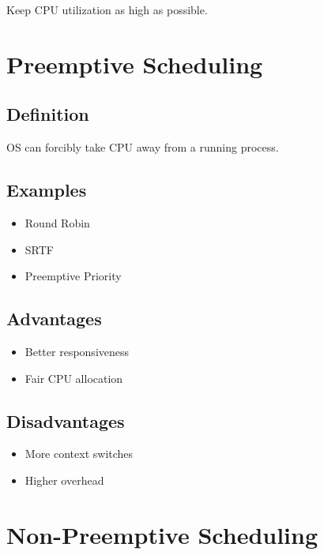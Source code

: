 Keep CPU utilization as high as possible.

\section{Preemptive Scheduling}

\subsection{Definition}

OS can forcibly take CPU away from a running process.

\subsection{Examples}

\begin{itemize}
\item Round Robin
\item SRTF
\item Preemptive Priority
\end{itemize}

\subsection{Advantages}

\begin{itemize}
\item Better responsiveness
\item Fair CPU allocation
\end{itemize}

\subsection{Disadvantages}

\begin{itemize}
\item More context switches
\item Higher overhead
\end{itemize}

\section{Non-Preemptive Scheduling}


